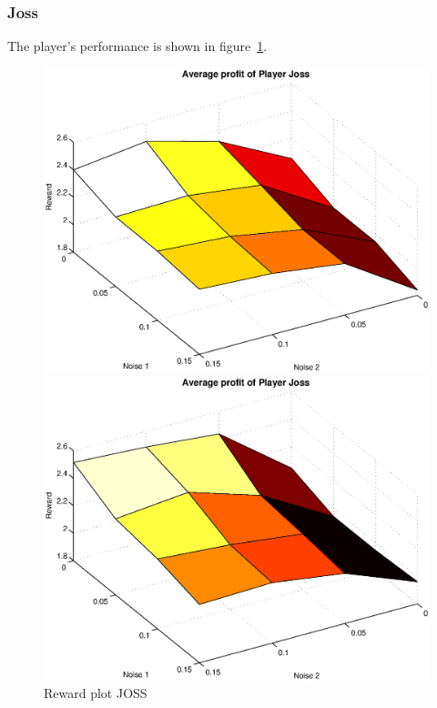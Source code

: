 \subsubsection{Joss}
The player's performance is shown in figure~\ref{pic player joss}.\\
\begin{figure}[h]
	\caption{Reward plot JOSS}
	\label{pic player joss}
\begin{minipage}[hbt]{0.65\textwidth}
	\centering
	\includegraphics[width=\textwidth]{pics/simulation1/Reward_vs_Noise_of_Player_Joss}
\end{minipage}
\hfill
\begin{minipage}[hbt]{0.3\textwidth}
	\centering
	\includegraphics[width=\textwidth]{pics/simulation2/Reward_vs_Noise_of_Player_Joss}
\end{minipage}

\end{figure}

